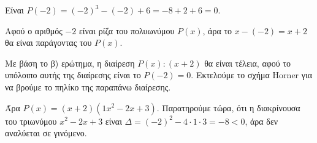 \begin{alist}
\item Είναι $P(-2) = (-2)^3 - (-2) + 6 = -8 + 2 + 6 = 0$.
\item Αφού ο αριθμός $-2$ είναι ρίζα του πολυωνύμου $P(x)$, άρα το $x - (-2) = x + 2$ θα είναι παράγοντας του $P(x)$.
\item Με βάση το β) ερώτημα, η διαίρεση $P(x) : (x + 2)$ θα είναι τέλεια, αφού το υπόλοιπο αυτής της διαίρεσης είναι το $P(-2) = 0$. Εκτελούμε το σχήμα Horner για να βρούμε το πηλίκο της παραπάνω διαίρεσης.
\begin{center}
\end{center}
Άρα $P(x) = (x + 2)(1x^2 - 2x + 3)$. Παρατηρούμε τώρα, ότι η διακρίνουσα του τριωνύμου $x^2 - 2x + 3$ είναι $\varDelta = (-2)^2 - 4 \cdot 1 \cdot 3 = -8 < 0$, άρα δεν αναλύεται σε γινόμενο.
\end{alist}

